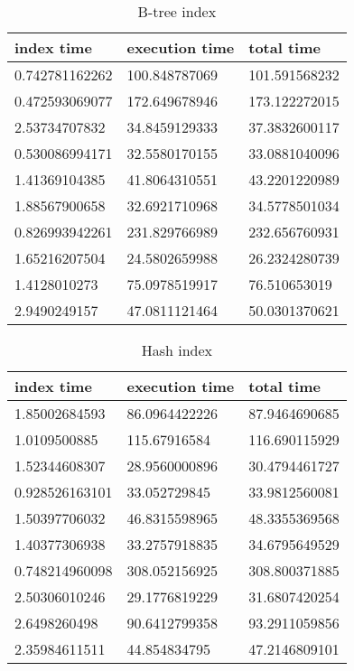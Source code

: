 \begin{itemize*}
\begin{table}[H]
\begin{center}
\begin{tabular}{|l|l|l|}
\hline
index time & execution time & total time                \\ \hline
0.742781162262 & 100.848787069 & 101.591568232 \\ \hline
0.472593069077 & 172.649678946 & 173.122272015 \\ \hline
2.53734707832 & 34.8459129333 & 37.3832600117 \\ \hline
0.530086994171 & 32.5580170155 & 33.0881040096 \\ \hline
1.41369104385 & 41.8064310551 & 43.2201220989 \\ \hline
1.88567900658 & 32.6921710968 & 34.5778501034 \\ \hline
0.826993942261 & 231.829766989 & 232.656760931 \\ \hline
1.65216207504 & 24.5802659988 & 26.2324280739 \\ \hline
1.4128010273 & 75.0978519917 & 76.510653019 \\ \hline
2.9490249157 & 47.0811121464 & 50.0301370621 \\ \hline
\end{tabular}
\end{center}
\caption{B-tree index}
\end{table}

\begin{table}[H]
\begin{center}
\begin{tabular}{|l|l|l|}
\hline
index time & execution time & total time     \\ \hline
1.85002684593 & 86.0964422226 & 87.9464690685 \\ \hline
1.0109500885 & 115.67916584 & 116.690115929 \\ \hline
1.52344608307 & 28.9560000896 & 30.4794461727 \\ \hline
0.928526163101 & 33.052729845 & 33.9812560081 \\ \hline
1.50397706032 & 46.8315598965 & 48.3355369568 \\ \hline
1.40377306938 & 33.2757918835 & 34.6795649529 \\ \hline
0.748214960098 & 308.052156925 & 308.800371885 \\ \hline
2.50306010246 & 29.1776819229 & 31.6807420254 \\ \hline
2.6498260498 & 90.6412799358 & 93.2911059856 \\ \hline
2.35984611511 & 44.854834795 & 47.2146809101 \\ \hline
\end{tabular}
\end{center}
\caption{Hash index}
\end{table}


\end{itemize*}
